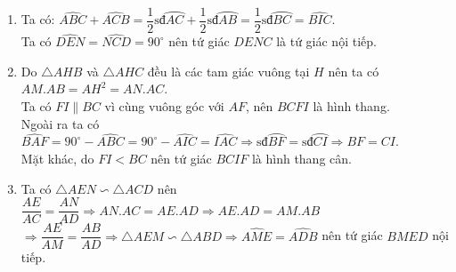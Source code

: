 \begin{ex}
{\begin{enumerate}
    		\item Ta có: $\widehat{ABC}+\widehat{ACB}=\dfrac{1}{2}\textrm{sđ}\wideparen{AC}+\dfrac{1}{2}\textrm{sđ}\wideparen{AB}=\dfrac{1}{2}\textrm{sđ}\wideparen{BC}=\widehat{BIC}$.\\
    		Ta có $\widehat{DEN}=\widehat{NCD}=90^\circ$ nên tứ giác $DENC$ là tứ giác nội tiếp.
    		\item Do $\triangle AHB$ và $\triangle AHC$ đều là các tam giác vuông tại $H$ nên ta có $AM.AB=AH^2=AN.AC$.\\
    		Ta có $FI\parallel BC$ vì cùng vuông góc với $AF$, nên $BCFI$ là hình thang.\\
    		Ngoài ra ta có $\widehat{BAF}=90^\circ-\widehat{ABC}=90^\circ-\widehat{AIC}=\widehat{IAC}\Rightarrow \textrm{sđ}\wideparen{BF}=\textrm{sđ}\wideparen{CI}\Rightarrow BF=CI$.\\
    		Mặt khác, do $FI<BC$ nên tứ giác  $BCIF$ là hình thang cân.
    		\item Ta có $\triangle AEN\backsim\triangle ACD$ nên $\dfrac{AE}{AC}=\dfrac{AN}{AD}\Rightarrow AN.AC=AE.AD\Rightarrow AE.AD=AM.AB$\\
    		$\Rightarrow\dfrac{AE}{AM}=\dfrac{AB}{AD}\Rightarrow\triangle AEM\backsim\triangle ABD\Rightarrow \widehat{AME}=\widehat{ADB}$ nên tứ giác $BMED$ nội tiếp.
    	\end{enumerate}}
\end{ex}

